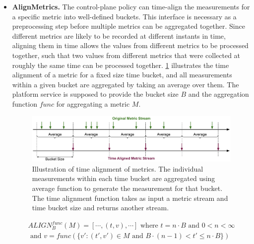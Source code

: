 \begin{itemize}
\item \textbf{AlignMetrics.} The control-plane policy can time-align the measurements for a specific metric into well-defined buckets. This interface is necessary as a preprocessing step before multiple metrics can be aggregated together. Since different metrics are likely to be recorded at different instants in time, aligning them in time allows the values from different metrics to be processed together, such that two values from different metrics that were collected at roughly the same time can be processed together. \cref{fig:time_alignment} illustrates the time alignment of a metric for a fixed size time bucket, and all measurements within a given bucket are aggregated by taking an average over them. The platform service is supposed to provide the bucket size $B$ and the aggregation function $func$ for aggregating a metric $M$.
\begin{figure}
\centering
\includegraphics[width=\linewidth]{figures/mechanisms/monitoring/time_alignment}
\caption{Illustration of time alignment of metrics. The individual measurements within each time bucket are aggregated using average function to generate the measurement for that bucket. The time alignment function takes as input a metric stream and time bucket size and returns another stream.}
\label{fig:time_alignment}
\end{figure}
\begin{multline}
ALIGN^{func}_{B} \left( M \right) = \left[ \cdots , \left( t, v \right) , \cdots \right] \text{ where } t = n\cdot B \text{ and } 0 < n < \infty \\ \text{ and } v = func \left( \{ v' : \left( t', v'\right) \in M \text{ and } B\cdot \left( n-1\right) < t' \leq n \cdot B \} \right)
\label{eq:metric_stream}
\end{multline}


\end{itemize}
